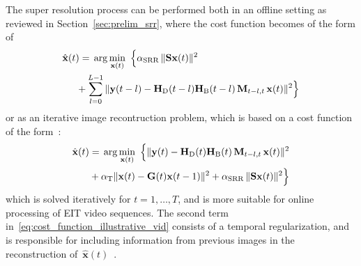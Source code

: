 \documentclass[10pt]{IEEEtran}
\newcommand{\vx}{\mathbf{x}}
\newcommand{\vxh}{\hat{\mathbf{x}}}
\newcommand{\vy}{\mathbf{y}}
\newcommand{\mG}{\mathbf{G}}
\newcommand{\mS}{\mathbf{S}}
\newcommand{\mH}{\mathbf{H}}
\newcommand{\mM}{\mathbf{M}}
\begin{document}
The super resolution process can be performed both in an offline setting as reviewed in Section~\ref{sec:prelim_srr}, where the cost function becomes of the form of~\cite{Nasrollahi14,elad1997srr_simple}
\begin{align} 
    & \vxh(t) {}={}
    \arg\min_{\vx(t)} \,\, \Big\{ \alpha_{\text{SRR}}\,\|\mS\vx(t)\|^2
    \\ & \hspace{0.5cm}
    + \sum_{l=0}^{L-1} \|\vy(t-l)
    -\mH_{\tiny{\text{D}}}(t-l) \mH_{\tiny{\text{B}}}(t-l)\,\mM_{t-l,t}\,\vx(t)\|^2
    \Big\}
    \nonumber
\end{align}
%
or as an iterative image recontruction problem, which is based on a cost function of the form~\cite{Nasrollahi14,Elad99,borsoi2017srr_conf}:
\begin{align} \label{eq:cost_function_illustrative_vid}
    \vxh(t) & {}={}  \arg\min_{\vx(t)} \,\, \Big\{\|\vy(t)-\mH_{\tiny{\text{D}}}(t) \mH_{\tiny{\text{B}}}(t)\,\mM_{t-l,t}\,\vx(t)\|^2 
\nonumber\\ & \hspace{0.0cm}
    + \alpha_{\text{T}} \|\vx(t) - \mG(t) \vx(t-1)\|^2
    + \alpha_{\text{SRR}}\,\|\mS\vx(t)\|^2 \Big\}
\end{align}
which is solved iteratively for $t=1,\ldots,T$, and is more suitable for online processing of EIT video sequences. The second term in~\eqref{eq:cost_function_illustrative_vid} consists of a temporal regularization, and is responsible for including information from previous images in the reconstruction of~$\vxh(t)$~\cite{borsoi2017srr_conf}.



\end{document}
